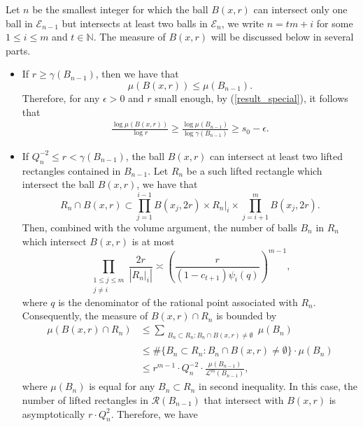\documentclass[11pt]{amsart}
\numberwithin{equation}{section}
\newcommand{\0}{\mathbf{0}}
\theoremstyle{remark}
\begin{document}
{Let $n$ be the smallest integer for which the ball $B(x,r)$ can intersect only one ball in $\mathcal{E}_{n-1}$ but intersects at least two balls in $\mathcal{E}_{n}$, we write $n=tm+i$ for some $1\le i\le m$ and $t\in\mathbb{N}$. The measure of $B(x,r)$ will be discussed below in several parts.
\begin{itemize}
\item[(1)] If $r\ge \gamma(B_{n-1})$, then we have that
$$\mu(B(x,r))\le\mu(B_{n-1}).$$
Therefore, for any $\epsilon>0$ and $r$ small enough, by (\ref{result_special}), it follows that 
\begin{align}\label{r1}
\frac{\log\mu(B(x,r))}{\log r}\ge\frac{\log \mu(B_{n-1})}{\log \gamma(B_{n-1})}\ge s_0-\epsilon.
\end{align}
\item[(2)] If $Q_n^{-2}\le r<\gamma(B_{n-1})$, the ball $B(x,r)$ can intersect at least two lifted rectangles contained in $B_{n-1}$. Let $R_n$ be a such lifted rectangle which intersect the ball $B(x,r)$, we have that
    $$R_n\cap B(x,r)\subset \prod_{j=1}^{i-1}B(x_j,2r)\times R_n\vert_i\times \prod_{j=i+1}^{m}B(x_j,2r).$$
    Then, combined with the volume argument, the number of balls $B_n$ in $R_n$ which intersect $B(x,r)$ is at most
    $$\prod_{\substack{1\le j\le m\\j\neq i}}\frac{2r}{|R_n\vert_i|}\asymp \left(\frac{r}{(1-c_{t+1})\psi_i(q)}\right)^{m-1},$$
    where $q$ is the denominator of the rational point associated with $R_n$. Consequently, the measure of $B(x,r)\cap R_n$ is bounded by
    \begin{equation}\label{single}
    \begin{split}
    \mu(B(x,r)\cap R_n)&\le\sum_{\substack{B_n\subset R_n:B_n\cap B(x,r)\neq\emptyset}}\mu(B_n)\\
    &\le \#\big\{B_n\subset R_n:B_n\cap B(x,r)\neq\emptyset\big\}\cdot\mu(B_{n})\\
    &\le r^{m-1}\cdot Q_n^{-2}\cdot\frac{\mu(B_{n-1})}{\mathcal{L}^m(B_{n-1})},
    \end{split}
    \end{equation}
    where $\mu(B_n)$ is equal for any $B_n\subset R_n$ in second inequality. In this case, the number of lifted rectangles in $\mathcal{R}(B_{n-1})$ that intersect with $B(x,r)$ is asymptotically $r\cdot Q_n^2$. Therefore, we have
    \begin{align*}

\end{align*}
\end{itemize}}
\end{document}
